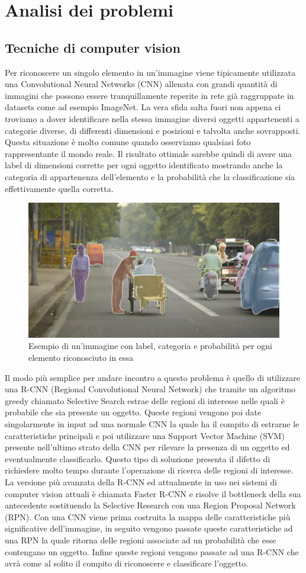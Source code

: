 \section{Analisi dei problemi}
\subsection{Tecniche di computer vision}
Per riconoscere un singolo elemento in un'immagine viene tipicamente utilizzata una Convolutional Neural Networks (CNN) allenata con grandi quantità di immagini che possono essere tranquillamente reperite in rete già raggruppate in datasets come ad esempio ImageNet.
La vera sfida salta fuori non appena ci troviamo a dover identificare nella stessa immagine diversi oggetti appartenenti a categorie diverse, di differenti dimensioni e posizioni e talvolta anche sovrapposti. Questa situazione è molto comune quando osserviamo qualsiasi foto rappresentante il mondo reale. Il risultato ottimale sarebbe quindi di avere una label di dimensioni corrette per ogni oggetto identificato mostrando anche la categoria di appartenenza dell'elemento e la probabilità che la classificazione sia effettivamente quella corretta.
\begin{figure}[H]
	\centering
	\includegraphics[width=0.7\linewidth]{images/Esempio-computer-vision.jpg}
	\caption{Esempio di un'immagine con label, categoria e probabilità per ogni elemento riconosciuto in essa}
	\label{Esempio di un frame di un video in 4K}
\end{figure}
Il modo più semplice per andare incontro a questo problema è quello di utilizzare una R-CNN (Regional Convolutional Neural Network) che tramite un algoritmo greedy chiamato Selective Search estrae delle regioni di interesse nelle quali è probabile che sia presente un oggetto. Queste regioni vengono poi date singolarmente in input ad una normale CNN la quale ha il compito di estrarne le caratteristiche principali e poi utilizzare una Support Vector Machine (SVM) presente nell'ultimo strato della CNN per rilevare la presenza di un oggetto ed eventualmente classificarlo. Questo tipo di soluzione presenta il difetto di richiedere molto tempo durante l'operazione di ricerca delle regioni di interesse.
La versione più avanzata della R-CNN ed attualmente in uso nei sistemi di computer vision attuali è chiamata Faster R-CNN e risolve il bottleneck della sua antecedente sostituendo la Selective Research con una Region Proposal Network (RPN). Con una CNN viene prima costruita la mappa delle caratteristiche più significative dell'immagine, in seguito vengono passate queste caratteristiche ad una RPN la quale ritorna delle regioni associate ad un probabilità che esse contengano un oggetto. Infine queste regioni vengono passate ad una
R-CNN che avrà come al solito il compito di riconoscere e classificare l'oggetto.
